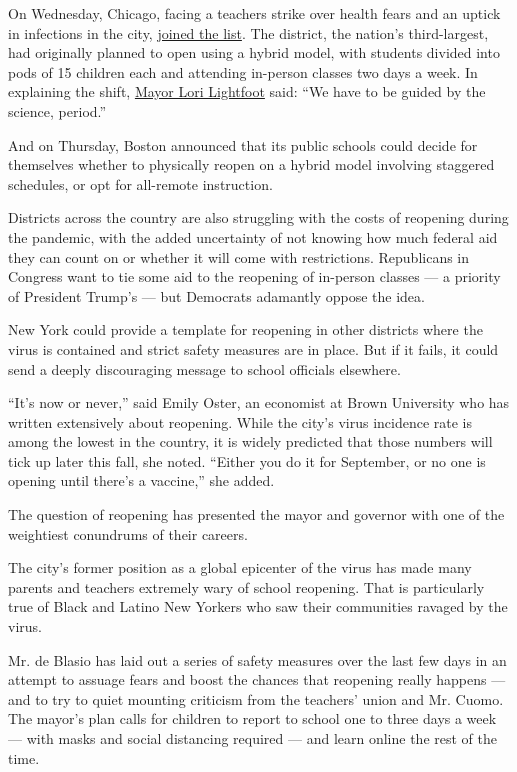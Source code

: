 On Wednesday, Chicago, facing a teachers strike over health fears and an
uptick in infections in the city,
\href{https://www.nytimes3xbfgragh.onion/2020/08/05/world/coronavirus-covid-19.html}{joined
the list}. The district, the nation's third-largest, had originally
planned to open using a hybrid model, with students divided into pods of
15 children each and attending in-person classes two days a week. In
explaining the shift,
\href{https://www.nytimes3xbfgragh.onion/2020/08/05/world/coronavirus-covid-19.html}{Mayor
Lori Lightfoot} said: ``We have to be guided by the science, period.''

And on Thursday, Boston announced that its public schools could decide
for themselves whether to physically reopen on a hybrid model involving
staggered schedules, or opt for all-remote instruction.

Districts across the country are also struggling with the costs of
reopening during the pandemic, with the added uncertainty of not knowing
how much federal aid they can count on or whether it will come with
restrictions. Republicans in Congress want to tie some aid to the
reopening of in-person classes --- a priority of President Trump's ---
but Democrats adamantly oppose the idea.

New York could provide a template for reopening in other districts where
the virus is contained and strict safety measures are in place. But if
it fails, it could send a deeply discouraging message to school
officials elsewhere.

``It's now or never,'' said Emily Oster, an economist at Brown
University who has written extensively about reopening. While the city's
virus incidence rate is among the lowest in the country, it is widely
predicted that those numbers will tick up later this fall, she noted.
``Either you do it for September, or no one is opening until there's a
vaccine,'' she added.

The question of reopening has presented the mayor and governor with one
of the weightiest conundrums of their careers.

The city's former position as a global epicenter of the virus has made
many parents and teachers extremely wary of school reopening. That is
particularly true of Black and Latino New Yorkers who saw their
communities ravaged by the virus.

Mr. de Blasio has laid out a series of safety measures over the last few
days in an attempt to assuage fears and boost the chances that reopening
really happens --- and to try to quiet mounting criticism from the
teachers' union and Mr. Cuomo. The mayor's plan calls for children to
report to school one to three days a week --- with masks and social
distancing required --- and learn online the rest of the time.

